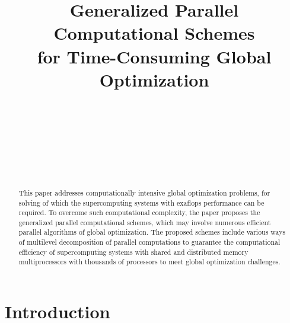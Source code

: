 \documentclass[
11pt,%
tightenlines,%
twoside,%
onecolumn,%
nofloats,%
nobibnotes,%
nofootinbib,%
superscriptaddress,%
noshowpacs,%
centertags]%
{revtex4}
\begin{document}

\title{Generalized Parallel Computational Schemes\\
for Time-Consuming Global Optimization}

\author{~}

\author{~}

\author{~}

\author{~}


\received{}

\begin{abstract}
This paper addresses computationally intensive global optimization problems, for solving of which the supercomputing systems with exaflops performance can be required. To overcome such computational complexity, the paper proposes the generalized parallel computational schemes, which may involve numerous efficient parallel algorithms of global optimization. The proposed schemes include various ways of multilevel decomposition of parallel computations to guarantee the computational efficiency of supercomputing systems with shared and distributed memory multiprocessors with thousands of processors to meet global optimization challenges.
\end{abstract}



\maketitle


\section{Introduction}
\end{document}
